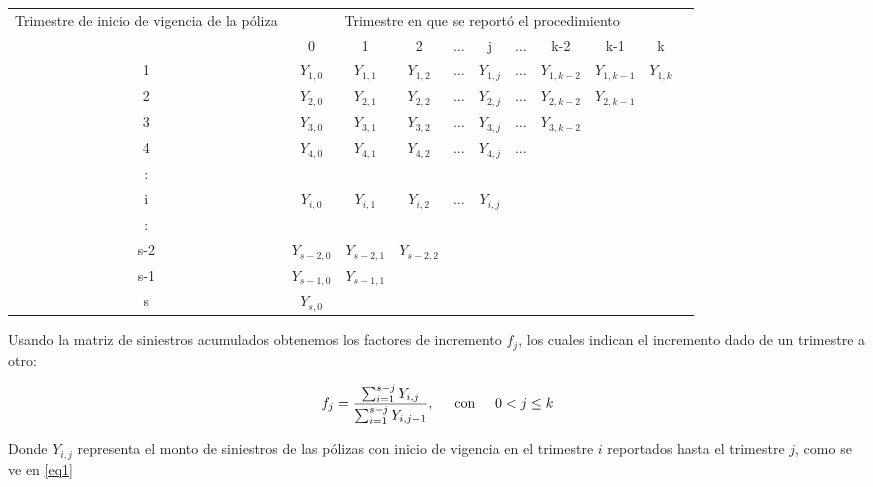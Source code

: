 \documentclass[11pt,twoside,openright,spanish]{report}
\numberwithin{equation}{chapter}
\numberwithin{figure}{chapter}
\numberwithin{table}{chapter}
\begin{document}
	\begin{table}[ht]
	\centering
	\begin{tabularx}{\linewidth}{c|cccccccccc}
		\multirow{2}{4cm}{Trimestre de inicio de vigencia de la póliza}&\multicolumn{9}{c}{ Trimestre en que se reportó el procedimiento} \\
		& 0  & 1 & 2 & $ \dots $ & j & $\dots $ & k-2 & k-1 &  k \\
		\midrule
		1      &  $Y_{1,0}^{}$ & $Y_{1,1}^{}$ & $Y_{1,2}^{}$ & $ \dots $ & $Y_{1,j}^{}$ & $ \dots $ & $Y_{1,k-2}^{}$ & $Y_{1,k-1}^{}$ & $Y_{1,k}^{}$ \\
		2      &  $Y_{2,0}^{}$ & $Y_{2,1}^{}$ & $Y_{2,2}^{}$ & $ \dots $ & $Y_{2,j}^{}$ & $ \dots $ & $Y_{2,k-2}^{}$ & $Y_{2,k-1}^{}$ & \\
		3      &  $Y_{3,0}^{}$ & $Y_{3,1}^{}$ & $Y_{3,2}^{}$ & $ \dots $ & $Y_{3,j}^{}$ & $ \dots $ & $Y_{3,k-2}^{}$ & & \\
		4      &  $Y_{4,0}^{}$ & $Y_{4,1}^{}$ & $Y_{4,2}^{}$ & $ \dots $ & $Y_{4,j}^{}$ & $ \dots $ & & & \\
		:      & & & & & & & & &\\
		i      &  $Y_{i,0}^{}$ & $Y_{i,1}^{}$ & $Y_{i,2}^{}$ & $ \dots $ & $Y_{i,j}^{}$ & & & & \\
		:      & & & & & & & & & \\
		s-2      &  $Y_{s-2,0}^{}$ & $Y_{s-2,1}^{}$ & $Y_{s-2,2}^{}$ & & & & & & \\
		s-1      &  $Y_{s-1,0}^{}$ & $Y_{s-1,1}^{}$ & & & & & & & \\
		s      &  $Y_{s,0}^{}$ & & & & & & & & \\
	\end{tabularx}
	\end{table}
	
	Usando la matriz de siniestros acumulados obtenemos los factores de incremento ${f}_{j}$, los cuales indican el incremento dado de un trimestre a otro:

	\begin{equation}
	{f}_{j}=\frac{\sum _{i=1}^{s-j}{Y}_{i,j}}{\sum _{i=1}^{s-j}{Y}_{i,j-1}}, \hspace{0.5cm}\text{con}\hspace{0.5cm} 0< j\le k
	\label{eq1}
	\end{equation}

	Donde ${Y}_{i,j}$ representa el monto de siniestros de las pólizas con inicio de vigencia en el trimestre $i$ reportados hasta el trimestre $j$, como se ve en \eqref{eq1}
\end{document}
